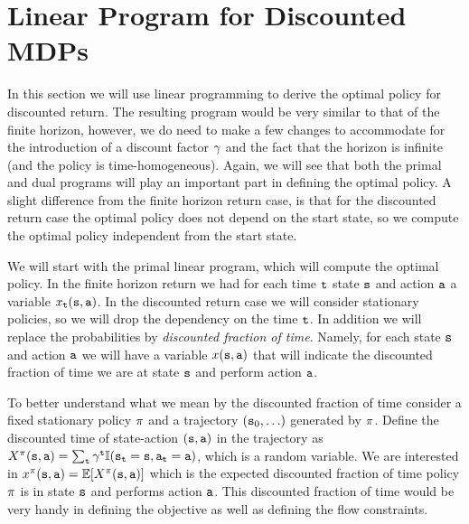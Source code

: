 \section{Linear Program for Discounted MDPs}
\label{chapter-discount:section:LP}

In this section we will use linear programming to derive the optimal
policy for discounted return.
%
The resulting program would be very similar to that of the finite horizon, however, we do need to make a few changes to accommodate for the introduction of a discount factor $\gamma$ and the fact that the horizon is infinite (and the policy is time-homogeneous).
%
Again, we will see that both the primal and dual programs will play an important part in defining the optimal policy. 
A slight difference from the finite horizon return case, is that for the discounted return case the optimal policy does not depend on the start state, so we compute the optimal policy independent from the start state.

We will start with the primal linear program, which will compute the optimal policy. In the finite horizon return we had for each time ${\tt t}$  state ${\tt s}$ and action ${\tt a}$ a variable $x_{\tt t}({\tt s},{\tt a})$.
In the discounted return case we will consider stationary policies, so we will drop the dependency on the time ${\tt t}$. In addition we will replace the probabilities by \textit{discounted fraction of time}.
Namely, for each state ${\tt s}$ and action ${\tt a}$ we will have a variable $x({\tt s},{\tt a})$ that will indicate the discounted fraction of time we are at state ${\tt s}$ and perform action ${\tt a}$.

To better understand what we mean by the {discounted fraction of time} consider a fixed stationary policy $\pi$ and a trajectory $({\tt s}_0, \ldots )$ generated by $\pi$. Define the discounted time of state-action $({\tt s},{\tt a})$ in the trajectory as $X^\pi({\tt s},{\tt a})=\sum_{\tt t} \gamma^{\tt t}\mathbb{I}({\tt s}_{\tt t}={\tt s},{\tt a}_{\tt t}={\tt a})$, which is a random variable. We are interested in
$x^\pi({\tt s},{\tt a})=\mathbb{E}[X^\pi({\tt s},{\tt a})]$ which is the expected discounted fraction of time policy $\pi$ is in state ${\tt s}$ and performs action ${\tt a}$.
This discounted fraction of time would be very handy in defining the objective as well as defining the flow constraints.

